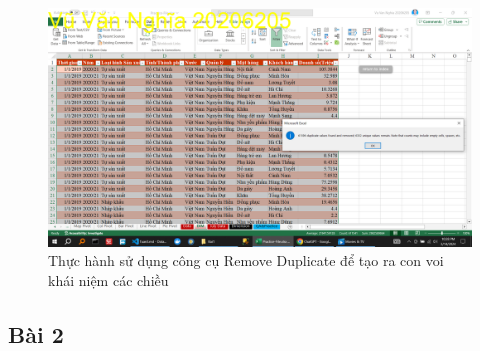 \documentclass{article}
\begin{document}
\begin{itemize}
\begin{figure}[H]
\centering
\includegraphics[scale = 0.15]{Bai1/ThucHanh/2.png}
\caption{Thực hành sử dụng công cụ Remove Duplicate để tạo ra con voi khái niệm các chiều}
\end{figure}

\end{itemize}

\subsection{Bài 2}




\end{document}
